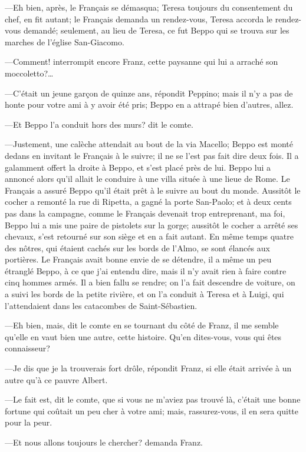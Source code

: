 —Eh bien, après, le Français se démasqua; Teresa toujours du consentement du chef, en fit autant; le Français demanda un rendez-vous, Teresa accorda le rendez-vous demandé; seulement, au lieu de Teresa, ce fut Beppo qui se trouva sur les marches de l'église San-Giacomo. 

—Comment! interrompit encore Franz, cette paysanne qui lui a arraché son moccoletto?\dots 

—C'était un jeune garçon de quinze ans, répondit Peppino; mais il n'y a pas de honte pour votre ami à y avoir été pris; Beppo en a attrapé bien d'autres, allez. 

—Et Beppo l'a conduit hors des murs? dit le comte. 

—Justement, une calèche attendait au bout de la via Macello; Beppo est monté dedans en invitant le Français à le suivre; il ne se l'est pas fait dire deux fois. Il a galamment offert la droite à Beppo, et s'est placé près de lui. Beppo lui a annoncé alors qu'il allait le conduire à une villa située à une lieue de Rome. Le Français a assuré Beppo qu'il était prêt à le suivre au bout du monde. Aussitôt le cocher a remonté la rue di Ripetta, a gagné la porte San-Paolo; et à deux cents pas dans la campagne, comme le Français devenait trop entreprenant, ma foi, Beppo lui a mis une paire de pistolets sur la gorge; aussitôt le cocher a arrêté ses chevaux, s'est retourné sur son siège et en a fait autant. En même temps quatre des nôtres, qui étaient cachés sur les bords de l'Almo, se sont élancés aux portières. Le Français avait bonne envie de se détendre, il a même un peu étranglé Beppo, à ce que j'ai entendu dire, mais il n'y avait rien à faire contre cinq hommes armés. Il a bien fallu se rendre; on l'a fait descendre de voiture, on a suivi les bords de la petite rivière, et on l'a conduit à Teresa et à Luigi, qui l'attendaient dans les catacombes de Saint-Sébastien. 

—Eh bien, mais, dit le comte en se tournant du côté de Franz, il me semble qu'elle en vaut bien une autre, cette histoire. Qu'en dites-vous, vous qui êtes connaisseur? 

—Je dis que je la trouverais fort drôle, répondit Franz, si elle était arrivée à un autre qu'à ce pauvre Albert. 

—Le fait est, dit le comte, que si vous ne m'aviez pas trouvé là, c'était une bonne fortune qui coûtait un peu cher à votre ami; mais, rassurez-vous, il en sera quitte pour la peur. 

—Et nous allons toujours le chercher? demanda Franz. 

